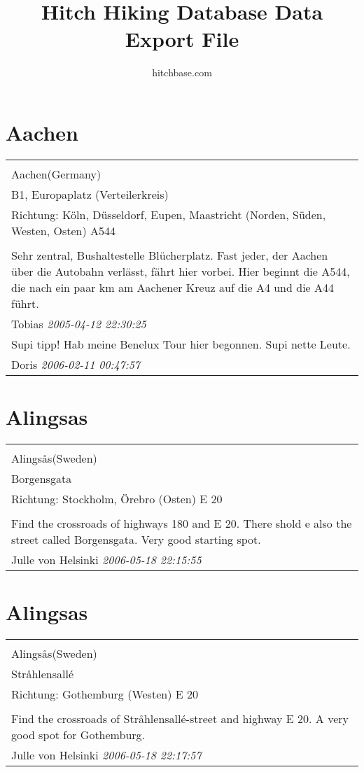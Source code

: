 \documentclass[a4paper,12pt]{article}
\title{Hitch Hiking Database Data Export File}
\author{hitchbase.com}
\begin{document}
\maketitle
\clearpage
\tableofcontents




\section{Aachen}
\begin{tabular}{|p{13cm}|}
\hline\\
Aachen(Germany)\\
B1, Europaplatz (Verteilerkreis)\\
Richtung: Köln, Düsseldorf, Eupen, Maastricht (Norden, Süden, Westen, Osten) A544 \\
\hline\\
Sehr zentral, Bushaltestelle Blücherplatz. Fast jeder, der Aachen über die Autobahn verlässt, fährt hier vorbei.
Hier beginnt die A544, die nach ein paar km am Aachener Kreuz auf die A4 und die A44 führt. \\
Tobias \textit{ 2005-04-12 22:30:25 }\\\hline Supi tipp! Hab meine Benelux Tour hier begonnen. Supi nette Leute. \\
Doris \textit{ 2006-02-11 00:47:57 }\\\hline
\end{tabular}


\section{Alingsas}
\begin{tabular}{|p{13cm}|}
\hline\\
Alingsås(Sweden)\\
Borgensgata\\
Richtung: Stockholm, Örebro (Osten) E 20 \\
\hline\\
Find the crossroads of highways 180 and E 20. There shold e also the street called Borgensgata. Very good starting spot. \\
Julle von Helsinki \textit{ 2006-05-18 22:15:55 }\\\hline
\end{tabular}


\section{Alingsas}
\begin{tabular}{|p{13cm}|}
\hline\\
Alingsås(Sweden)\\
Stråhlensallé\\
Richtung: Gothemburg (Westen) E 20 \\
\hline\\
Find the crossroads of Stråhlensallé-street and highway E 20. A very good spot for Gothemburg. \\
Julle von Helsinki \textit{ 2006-05-18 22:17:57 }\\\hline
\end{tabular}
\end{document}
